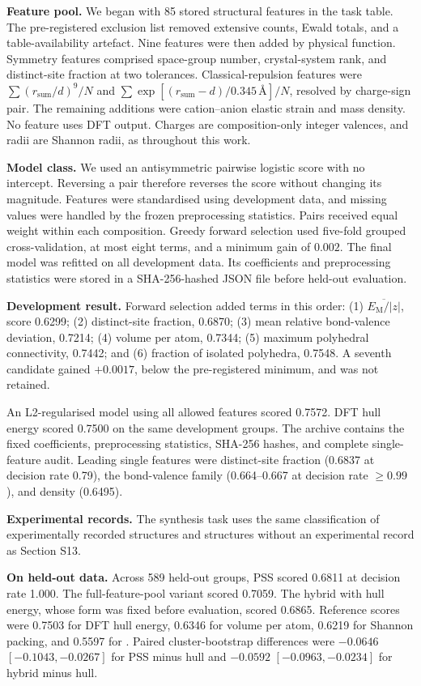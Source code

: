 \textbf{Feature pool.} We began with 85 stored structural features in the task
table. The pre-registered exclusion list removed extensive counts, Ewald totals,
and a table-availability artefact. Nine features were then added by physical
function. Symmetry features comprised space-group number, crystal-system rank,
and distinct-site fraction at two tolerances. Classical-repulsion features were
$\sum (r_{\mathrm{sum}}/d)^9/N$ and
$\sum \exp[(r_{\mathrm{sum}}-d)/0.345\,\text{\AA}]/N$, resolved by charge-sign
pair. The remaining additions were cation--anion elastic strain and mass density.
No feature uses DFT output. Charges are composition-only integer valences, and
radii are Shannon radii, as throughout this work.

\textbf{Model class.} We used an antisymmetric pairwise logistic score with no
intercept. Reversing a pair therefore reverses the score without changing its
magnitude. Features were standardised using development data, and missing values
were handled by the frozen preprocessing statistics. Pairs received equal weight
within each composition. Greedy forward selection used five-fold grouped
cross-validation, at most eight terms, and a minimum gain of $0.002$. The final
model was refitted on all development data. Its coefficients and preprocessing
statistics were stored in a SHA-256-hashed JSON file before held-out evaluation.

\textbf{Development result.} Forward selection added terms in this order:
(1) $\overline{E_{\mathrm{M}}/|z|}$, score 0.6299; (2) distinct-site fraction,
0.6870; (3) mean relative bond-valence deviation, 0.7214; (4) volume per atom,
0.7344; (5) maximum polyhedral connectivity, 0.7442; and (6) fraction of
isolated polyhedra, 0.7548. A seventh candidate gained $+0.0017$, below the
pre-registered minimum, and was not retained.

An L2-regularised model using all allowed features scored 0.7572. DFT hull
energy scored 0.7500 on the same development groups. The archive contains the
fixed coefficients, preprocessing statistics, SHA-256 hashes, and complete
single-feature audit. Leading single features were distinct-site fraction
(0.6837 at decision rate 0.79), the bond-valence family (0.664--0.667 at decision
rate $\geq0.99$), and density (0.6495).

\textbf{Experimental records.} The synthesis task uses the same classification of
experimentally recorded structures and structures without an experimental record as Section S13.

\textbf{On held-out data.} Across 589 held-out groups, PSS scored 0.6811 at
decision rate 1.000. The full-feature-pool variant scored 0.7059. The hybrid with
hull energy, whose form was fixed before evaluation, scored 0.6865. Reference
scores were 0.7503 for DFT hull energy, 0.6346 for volume per atom, 0.6219 for
Shannon packing, and 0.5597 for \rhoc{}. Paired cluster-bootstrap differences
were $-0.0646$ $[-0.1043,-0.0267]$ for PSS minus hull and $-0.0592$
$[-0.0963,-0.0234]$ for hybrid minus hull.

